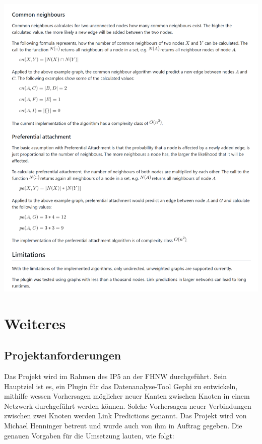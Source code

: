 \includegraphics[width=\textwidth]{resources/readme_pt3.png}



\chapter{Weiteres}

\section{Projektanforderungen}
\label{projektanforderungen}
Das Projekt wird im Rahmen des IP5 an der FHNW durchgeführt. Sein Hauptziel ist es, ein Plugin für das Datenanalyse-Tool Gephi zu entwickeln, mithilfe wessen Vorhersagen möglicher neuer Kanten zwischen Knoten in einem Netzwerk durchgeführt werden können. Solche Vorhersagen neuer Verbindungen zwischen zwei Knoten werden Link Predictions genannt. Das Projekt wird von Michael Henninger betreut und wurde auch von ihm in Auftrag gegeben.
Die genauen Vorgaben für die Umsetzung lauten, wie folgt:

